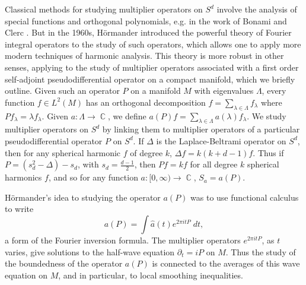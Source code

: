 \documentclass[11pt]{article}
\DeclareMathOperator{\RR}{\mathbb{R}}
\DeclareMathOperator{\CC}{\mathbb{C}}
\begin{document}
Classical methods for studying multiplier operators on $S^d$ involve the analysis of special functions and orthogonal polynomials, e.g. in the work of Bonami and Clerc \cite{BonamiClerc}. But in the 1960s, H\"{o}rmander introduced the powerful theory of Fourier integral operators to the study of such operators, which allows one to apply more modern techniques of harmonic analysis. This theory is more robust in other senses, applying to the study of multiplier operators associated with a first order self-adjoint pseudodifferential operator on a compact manifold, which we briefly outline. Given such an operator $P$ on a manifold $M$ with eigenvalues $\Lambda$, every function $f \in L^2(M)$ has an orthogonal decomposition $f = \sum_{\lambda \in \Lambda} f_\lambda$ where $Pf_\lambda = \lambda f_\lambda$. Given $a: \Lambda \to \CC$, we define $a(P) f = \sum\nolimits_{\lambda \in \Lambda} a(\lambda) f_\lambda$.  We study multiplier operators on $S^d$ by linking them to multiplier operators of a particular pseudodifferential operator $P$ on $S^d$. If $\Delta$ is the Laplace-Beltrami operator on $S^d$, then for any spherical harmonic $f$ of degree $k$, $\Delta f = k(k+d-1) f$. Thus if $P = (s_d^2 - \Delta) - s_d$, with $s_d = {\scriptstyle \frac{d-1}{2}}$, then $Pf = kf$ for all degree $k$ spherical harmonics $f$, and so for any function $a: [0,\infty) \to \CC$, $S_a = a(P)$.

H\"{o}rmander's idea to studying the operator $a(P)$ was to use functional calculus to write
%
\[ a(P) = \int \widehat{a}(t) e^{2 \pi i t P}\; dt, \]
%
a form of the Fourier inversion formula. The multiplier operators $e^{2 \pi i t P}$, as $t$ varies, give solutions to the half-wave equation $\partial_t = i P$ on $M$. Thus the study of the boundedness of the operator $a(P)$ is connected to the averages of this wave equation on $M$, and in particular, to local smoothing inequalities. %
\end{document}
